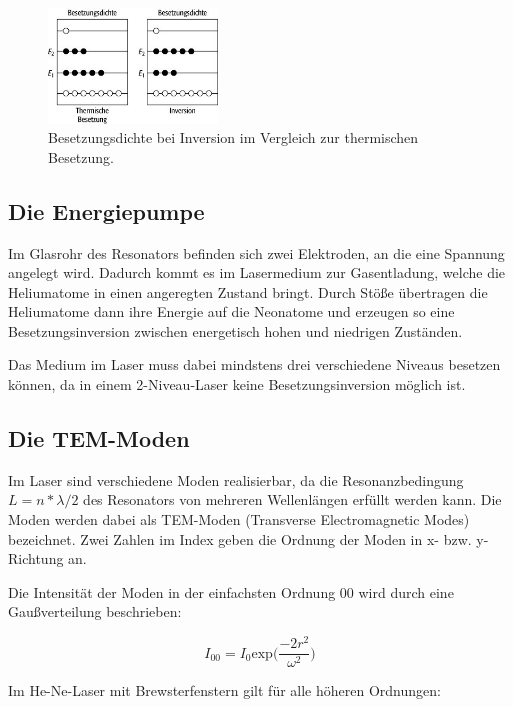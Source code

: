 \begin{figure}
\centering
\includegraphics[width=0.4\textwidth]{inversion.jpg}
\caption{Besetzungsdichte bei Inversion im Vergleich zur thermischen Besetzung.\cite{spektrum}}
\label{fig:inversion}
\end{figure}

\subsection{Die Energiepumpe}

Im Glasrohr des Resonators befinden sich zwei Elektroden, an die eine Spannung angelegt wird. Dadurch kommt es im Lasermedium
zur Gasentladung, welche die Heliumatome in einen angeregten Zustand bringt. Durch Stöße übertragen die Heliumatome dann
ihre Energie auf die Neonatome und erzeugen so eine Besetzungsinversion zwischen energetisch hohen und niedrigen
Zuständen.

Das Medium im Laser muss dabei mindstens drei verschiedene Niveaus besetzen können, da in einem 2-Niveau-Laser keine
Besetzungsinversion möglich ist.

\subsection{Die TEM-Moden}

Im Laser sind verschiedene Moden realisierbar, da die Resonanzbedingung $L = n*\lambda/2$ des Resonators von mehreren Wellenlängen
erfüllt werden kann. Die Moden werden dabei als TEM-Moden (Transverse Electromagnetic Modes) bezeichnet. Zwei Zahlen
im Index geben die Ordnung der Moden in x- bzw. y-Richtung an.

Die Intensität der Moden in der einfachsten Ordnung 00 wird durch eine Gaußverteilung beschrieben:

\begin{equation}
  I_{00} = I_0 \text{exp} \biggl(\frac{-2r^2}{\omega^2}\biggr)
\end{equation}

Im He-Ne-Laser mit Brewsterfenstern gilt für alle höheren Ordnungen:

